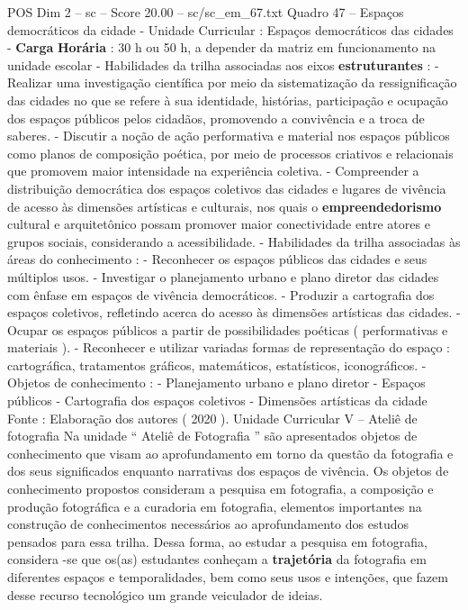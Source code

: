\begin{textsample}{POS Dim 2 – sc – Score 20.00 – sc/sc\_em\_67.txt}
Quadro 47 – Espaços democráticos da cidade - Unidade Curricular : Espaços democráticos das cidades - \textbf{Carga} \textbf{Horária} : 30 h ou 50 h, a depender da matriz em funcionamento na unidade escolar - Habilidades da trilha associadas aos eixos \textbf{estruturantes} : - Realizar uma investigação científica por meio da sistematização da ressignificação das cidades no que se refere à sua identidade, histórias, participação e ocupação dos espaços públicos pelos cidadãos, promovendo a convivência e a troca de saberes. - Discutir a noção de ação performativa e material nos espaços públicos como planos de composição poética, por meio de processos criativos e relacionais que promovem maior intensidade na experiência coletiva. - Compreender a distribuição democrática dos espaços coletivos das cidades e lugares de vivência de acesso às dimensões artísticas e culturais, nos quais o \textbf{empreendedorismo} cultural e arquitetônico possam promover maior conectividade entre atores e grupos sociais, considerando a acessibilidade. - Habilidades da trilha associadas às áreas do conhecimento : - Reconhecer os espaços públicos das cidades e seus múltiplos usos. - Investigar o planejamento urbano e plano diretor das cidades com ênfase em espaços de vivência democráticos. - Produzir a cartografia dos espaços coletivos, refletindo acerca do acesso às dimensões artísticas das cidades. - Ocupar os espaços públicos a partir de possibilidades poéticas ( performativas e materiais ). - Reconhecer e utilizar variadas formas de representação do espaço : cartográfica, tratamentos gráficos, matemáticos, estatísticos, iconográficos. - Objetos de conhecimento : - Planejamento urbano e plano diretor - Espaços públicos - Cartografia dos espaços coletivos - Dimensões artísticas da cidade Fonte : Elaboração dos autores ( 2020 ).
Unidade Curricular V – Ateliê de fotografia Na unidade “ Ateliê de Fotografia ” são apresentados objetos de conhecimento que visam ao aprofundamento em torno da questão da fotografia e dos seus significados enquanto narrativas dos espaços de vivência.
Os objetos de conhecimento propostos consideram a pesquisa em fotografia, a composição e produção fotográfica e a curadoria em fotografia, elementos importantes na construção de conhecimentos necessários ao aprofundamento dos estudos pensados para essa trilha.
Dessa forma, ao estudar a pesquisa em fotografia, considera -se que os(as) estudantes conheçam a \textbf{trajetória} da fotografia em diferentes espaços e temporalidades, bem como seus usos e intenções, que fazem desse recurso tecnológico um grande veiculador de ideias.

\end{textsample}
